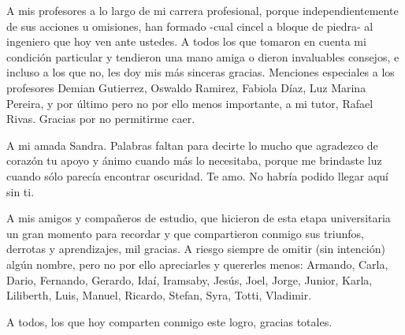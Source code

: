 A mis profesores a lo largo de mi carrera profesional, porque independientemente de sus acciones u omisiones, han formado -cual cincel a bloque de piedra- al ingeniero que hoy ven ante ustedes. A todos los que tomaron en cuenta mi condición particular y tendieron una mano amiga o dieron invaluables consejos, e incluso a los que no, les doy mis más sinceras gracias. Menciones especiales a los profesores Demian Gutierrez, Oswaldo Ramirez, Fabiola Díaz, Luz Marina Pereira, y por último pero no por ello menos importante, a mi tutor, Rafael Rivas. Gracias por no permitirme caer.

A mi amada Sandra. Palabras faltan para decirte lo mucho que agradezco de corazón tu apoyo y ánimo cuando más lo necesitaba, porque me brindaste luz cuando sólo parecía encontrar oscuridad. Te amo. No habría podido llegar aquí sin ti.

A mis amigos y compañeros de estudio, que hicieron de esta etapa universitaria un gran momento para recordar y que compartieron conmigo sus triunfos, derrotas y aprendizajes, mil gracias. A riesgo siempre de omitir (sin intención) algún nombre, pero no por ello apreciarles y quererles menos: Armando, Carla, Dario, Fernando, Gerardo, Idaí, Iramsaby, Jesús, Joel, Jorge, Junior, Karla, Liliberth, Luis, Manuel, Ricardo, Stefan, Syra, Totti, Vladimir.

A todos, los que hoy comparten conmigo este logro, gracias totales.